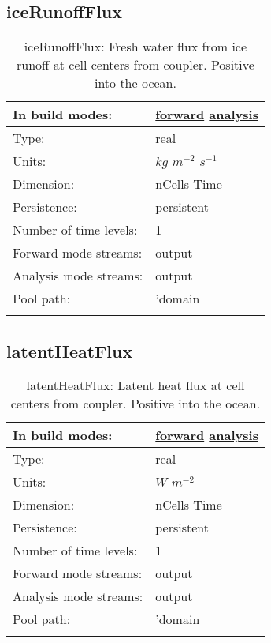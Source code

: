\subsection[iceRunoffFlux]{iceRunoffFlux}
\label{subsec:var_sec_forcing_iceRunoffFlux}
\begin{center}
\begin{longtable}{| p{2.0in} | p{4.0in} |}
        \hline 
        In build modes: & \hyperref[subsec:forward_var_tab_forcing]{forward} \hyperref[subsec:analysis_var_tab_forcing]{analysis} \\
        \hline 
        Type: & real \\
        \hline 
        Units: & $kg$ $m^{-2}$ $s^{-1}$ \\
        \hline 
        Dimension: & nCells Time \\
        \hline 
        Persistence: & persistent \\
        \hline 
        Number of time levels: & 1 \\
        \hline 
		 Forward mode streams: &  output \\
        \hline 
		 Analysis mode streams: &  output \\
        \hline 
            Pool path: & 'domain %
 \\
		 \hline 
    \caption{iceRunoffFlux: Fresh water flux from ice runoff at cell centers from coupler. Positive into the ocean.}
\end{longtable}
\end{center}
\subsection[latentHeatFlux]{latentHeatFlux}
\label{subsec:var_sec_forcing_latentHeatFlux}
\begin{center}
\begin{longtable}{| p{2.0in} | p{4.0in} |}
        \hline 
        In build modes: & \hyperref[subsec:forward_var_tab_forcing]{forward} \hyperref[subsec:analysis_var_tab_forcing]{analysis} \\
        \hline 
        Type: & real \\
        \hline 
        Units: & $W$ $m^{-2}$ \\
        \hline 
        Dimension: & nCells Time \\
        \hline 
        Persistence: & persistent \\
        \hline 
        Number of time levels: & 1 \\
        \hline 
		 Forward mode streams: &  output \\
        \hline 
		 Analysis mode streams: &  output \\
        \hline 
            Pool path: & 'domain %
 \\
		 \hline 
    \caption{latentHeatFlux: Latent heat flux at cell centers from coupler. Positive into the ocean.}
\end{longtable}
\end{center}
